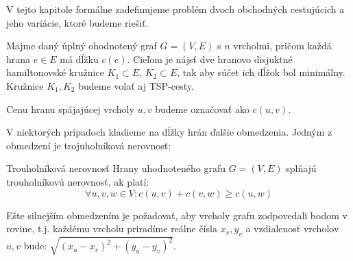 V tejto kapitole formálne zadefinujeme problém dvoch obchodných cestujúcich
a jeho variácie, ktoré budeme riešiť.

\begin{definicia}
Majme daný úplný ohodnotený graf $G = (V, E)$ s $n$ vrcholmi, pričom každá hrana
$e \in E$ má dĺžku $c(e)$. Cieľom je nájsť dve hranovo disjuktné hamiltonovské kružnice
$K_1 \subset E$, $K_2 \subset E$, tak aby súčet ich dĺžok bol minimálny.
Kružnice $K_1, K_2$ budeme volať aj TSP-cesty.
\end{definicia}

\begin{poznamka}
Cenu hranu spájajúcej vrcholy $u, v$ budeme označovať ako $c(u, v)$. 
\end{poznamka}

V niektorých prípadoch kladieme na dĺžky hrán ďalšie obmedzenia.
Jedným z obmedzení je trojuholníková nerovnosť:

\begin{definicia}{Trouholníková nerovnosť}
Hrany uhodnoteného grafu $G = (V, E)$ splňajú trouholníkovú nerovnosť, ak platí:
$$\forall u,v,w \in V: c(u,v) + c(v,w) \geq c(u,w)$$
\end{definicia}

Ešte silnejším obmedzením je požadovať, aby vrcholy grafu zodpovedali bodom v rovine, t.j.
každému vrcholu priradíme reálne čísla $x_v, y_v$ a vzdialenosť vrcholov $u, v$ bude:
$\sqrt{(x_u - x_v)^2 + (y_u - y_v)^2}$.


